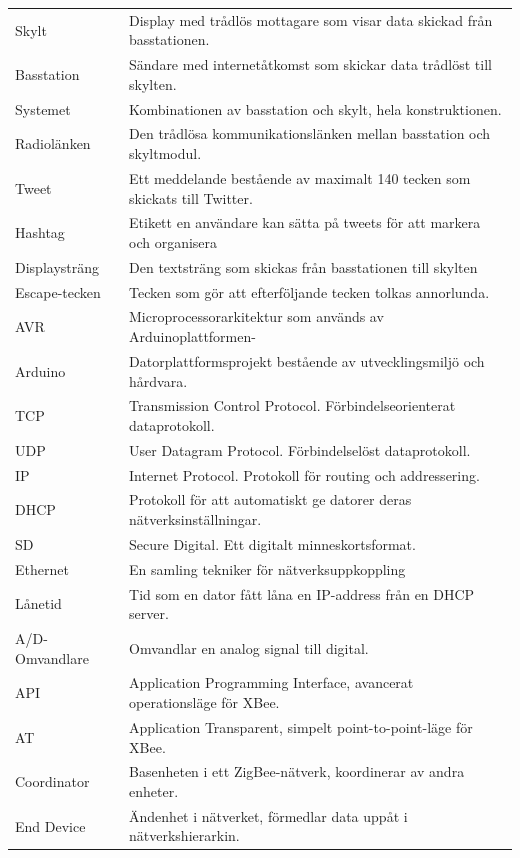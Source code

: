 \documentclass[a4paper,11pt]{article}
\begin{document}
\begin{table}[h]
\centering
	\begin{tabular}{|l|l|}
Skylt & Display med trådlös mottagare som visar data skickad från basstationen.\\
Basstation & Sändare med internetåtkomst som skickar data trådlöst till skylten.\\
Systemet & Kombinationen av basstation och skylt, hela konstruktionen.\\
Radiolänken & Den trådlösa kommunikationslänken mellan basstation och skyltmodul.\\
Tweet & Ett meddelande bestående av maximalt 140 tecken som skickats till Twitter.\\
Hashtag & Etikett en användare kan sätta på tweets för att markera och organisera\\
Displaysträng & Den textsträng som skickas från basstationen till skylten \\
Escape-tecken & Tecken som gör att efterföljande tecken tolkas annorlunda.\\
AVR & Microprocessorarkitektur som används av Arduinoplattformen-\\
Arduino & Datorplattformsprojekt bestående av utvecklingsmiljö och hårdvara.\\
TCP & Transmission Control Protocol. Förbindelseorienterat dataprotokoll.\\
UDP & User Datagram Protocol. Förbindelselöst dataprotokoll.\\
IP & Internet Protocol. Protokoll för routing och addressering.\\
DHCP & Protokoll för att automatiskt ge datorer deras nätverksinställningar.\\
SD & Secure Digital. Ett digitalt minneskortsformat.\\
Ethernet & En samling tekniker för nätverksuppkoppling\\
Lånetid & Tid som en dator fått låna en IP-address från en DHCP server.\\
A/D-Omvandlare & Omvandlar en analog signal till digital.\\
API & Application Programming Interface, avancerat operationsläge för XBee.\\
AT & Application Transparent, simpelt point-to-point-läge för XBee.\\
Coordinator & Basenheten i ett ZigBee-nätverk, koordinerar av andra enheter.\\
End Device & Ändenhet i nätverket, förmedlar data uppåt i nätverkshierarkin.\\

\end{tabular}
\end{table}
\end{document}
